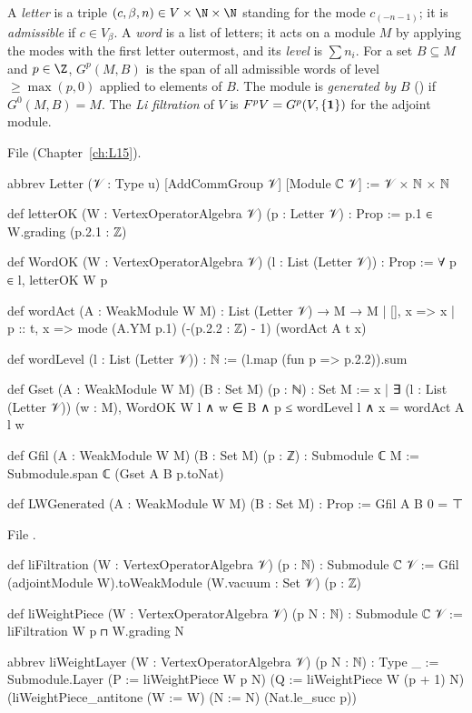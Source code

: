 \begin{definition}\label{l11:def:gfil}
A \emph{letter} is a triple $(c,\beta,n)\in V\times\N\times\N$ standing for the mode $c_{(-n-1)}$; it is
\emph{admissible} if $c\in V_\beta$. A \emph{word} is a list of letters; it acts on a module $M$ by
applying the modes with the first letter outermost, and its \emph{level} is $\sum n_i$. For a set
$B\subseteq M$ and $p\in\Z$, $G^p(M,B)$ is the span of all admissible words of level $\ge\max(p,0)$
applied to elements of $B$. The module is \emph{generated by $B$} () if $G^0(M,B) = M$.
The \emph{Li filtration} of $V$ is $F^pV = G^p(V,\{\mathbf{1}\})$ for the adjoint module.
\end{definition}
\noindent File  (Chapter~\ref{ch:L15}).
\begin{leancode}
abbrev Letter (𝒱 : Type u) [AddCommGroup 𝒱] [Module ℂ 𝒱] := 𝒱 × ℕ × ℕ

def letterOK (W : VertexOperatorAlgebra 𝒱) (p : Letter 𝒱) : Prop :=
  p.1 ∈ W.grading (p.2.1 : ℤ)

def WordOK (W : VertexOperatorAlgebra 𝒱) (l : List (Letter 𝒱)) : Prop := ∀ p ∈ l, letterOK W p

def wordAct (A : WeakModule W M) : List (Letter 𝒱) → M → M
  | [], x => x
  | p :: t, x => mode (A.YM p.1) (-(p.2.2 : ℤ) - 1) (wordAct A t x)

def wordLevel (l : List (Letter 𝒱)) : ℕ := (l.map (fun p => p.2.2)).sum

def Gset (A : WeakModule W M) (B : Set M) (p : ℕ) : Set M :=
  {x | ∃ (l : List (Letter 𝒱)) (w : M), WordOK W l ∧ w ∈ B ∧ p ≤ wordLevel l ∧
    x = wordAct A l w}

def Gfil (A : WeakModule W M) (B : Set M) (p : ℤ) : Submodule ℂ M :=
  Submodule.span ℂ (Gset A B p.toNat)

def LWGenerated (A : WeakModule W M) (B : Set M) : Prop := Gfil A B 0 = ⊤
\end{leancode}
\noindent File .
\begin{leancode}
def liFiltration (W : VertexOperatorAlgebra 𝒱) (p : ℕ) : Submodule ℂ 𝒱 :=
  Gfil (adjointModule W).toWeakModule ({W.vacuum} : Set 𝒱) (p : ℤ)

def liWeightPiece (W : VertexOperatorAlgebra 𝒱) (p N : ℕ) : Submodule ℂ 𝒱 :=
  liFiltration W p ⊓ W.grading N

abbrev liWeightLayer (W : VertexOperatorAlgebra 𝒱) (p N : ℕ) : Type _ :=
  Submodule.Layer (P := liWeightPiece W p N) (Q := liWeightPiece W (p + 1) N)
    (liWeightPiece_antitone (W := W) (N := N) (Nat.le_succ p))
\end{leancode}

